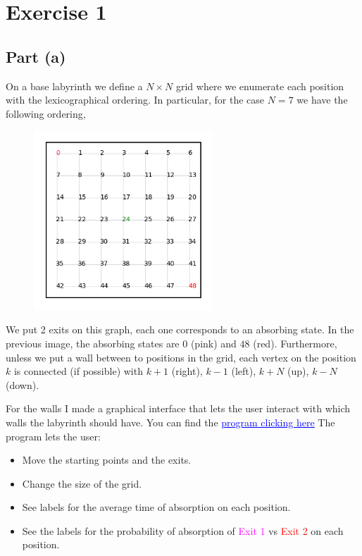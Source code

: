 \section{Exercise 1} 

\subsection*{Part (a)}

On a base labyrinth we define a $N\times N$ grid where we enumerate each position with the lexicographical ordering. In particular, for the case $N = 7$ we have the following ordering,

\begin{figure}[H]
    \centering
    \includegraphics[width=0.6\textwidth]{../pictures/numbering.png}
\end{figure}

We put 2 exits on this graph, each one corresponds to an absorbing state. In the previous image, the absorbing states are $0$ (pink) and $48$ (red). Furthermore, unless we put a wall between to positions in the grid, each vertex on the position $k$ is connected (if possible) with $k+1$ (right), $k-1$ (left), $k+N$ (up), $k-N$ (down).

For the walls I made a graphical interface that lets the user interact with which walls the labyrinth should have. You can find the \href{https://colab.research.google.com/drive/1S1VUt5ehHkPthAicE4mKvIPgcmJihZ6H?usp=sharing}{\textcolor{blue}{\underline{program clicking here}}} The program lets the user:
\begin{itemize}
    \item Move the starting points and the exits.
    \item Change the size of the grid.
    \item See labels for the average time of absorption on each position.
    \item See the labels for the probability of absorption of \textcolor{magenta}{Exit 1} vs \textcolor{red}{Exit 2} on each position.
\end{itemize}

